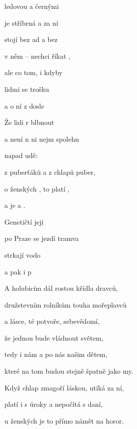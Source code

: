 

\zs
{} ledovou  a černými 

je stříbrná  a za ní 

stojí  bez ad a bez 

 v něm -- nechci říkat ,

ale co  tom, i kdyby 

 lidmi se trošku 

a  o ní  z dosle
\ks

\zr
Že lidi r blbnout 

a není n ni nejm spolehn

 napad udě:  

z puberťáků  a z chlapů puber,

o ženských ,  to platí ,

a  je a .
\kr

\zs
Genetičtí   její  

po Praze se   jezdí tramva  

strkají   vodo  

a pak i  p
\ks

\zr
A holubicím dál rostou křídla dravců,

družstevním rolníkům touha mořeplavců

a lásce, té potvoře, sebevědomí,

že jednou bude vládnout světem,

tedy i nám a po nás našim dětem,

které na tom budou stejně špatně jako my.
\kr

\zr
Když chlap zmagoří láskou, utíká za ní,

platí i s úroky a nepočítá s daní,

u ženských je to přímo námět na horor.

